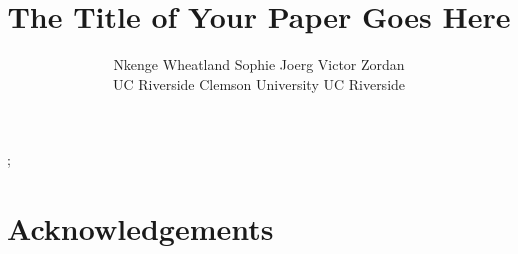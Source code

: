 \documentclass[review]{acmsiggraph}
\title{The Title of Your Paper Goes Here}
\author{Nkenge Wheatland \hspace{10 mm}  
Sophie Joerg
\hspace{10 mm} 
Victor Zordan 
\\UC Riverside
\hspace{16 mm} Clemson University
\hspace{16 mm} UC Riverside}
\begin{document}

\maketitle

\begin{abstract}


\end{abstract}

\begin{CRcatlist}
  ;
\end{CRcatlist}

\keywordlist

\TOGlinkslist

\copyrightspace












\iffalse
\begin{equation}
 \sum_{j=1}^{z} j = \frac{z(z+1)}{2}
\end{equation}

\begin{eqnarray}
x & \ll & y_{1} + \cdots + y_{n} \\
  & \leq & z
\end{eqnarray}


\begin{figure}[ht]
  \centering
  \texttt{[image: images/samplefigure]}
  \caption{Sample illustration.}
\end{figure}
\fi


\section*{Acknowledgements}



\end{document}
